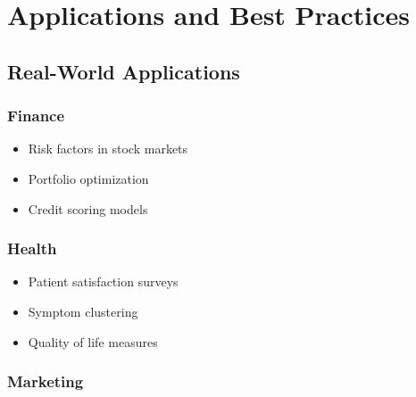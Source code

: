 \documentclass[
]{article}
\begin{document}
\begin{Shaded}
\begin{Highlighting}[]
\OperatorTok{=}\OperatorTok{=}\OperatorTok{=}\NormalTok{)}

\OperatorTok{=}
\OperatorTok{=}
\OperatorTok{=}
\end{Highlighting}
\end{Shaded}

\section{Applications and Best Practices}

\subsection{Real-World Applications}

\subsubsection{Finance}

\begin{itemize}
\item
  Risk factors in stock markets
\item
  Portfolio optimization
\item
  Credit scoring models
\end{itemize}

\subsubsection{Health}

\begin{itemize}
\item
  Patient satisfaction surveys
\item
  Symptom clustering
\item
  Quality of life measures
\end{itemize}

\subsubsection{Marketing}
\end{document}

